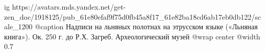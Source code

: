  
 
 
 
 

\ifcmt
  ig https://avatars.mds.yandex.net/get-zen_doc/1918125/pub_61e80efaf9f75d0fb45a8f17_61e82ba18cd6ab17eb0db122/scale_1200
  @caption Надписи на льняных полотнах на этрусском языке («Льняная книга»). Ок. 250 г. до Р.Х. Загреб. Археологический музей
  @wrap center
  @width 0.7
\fi
